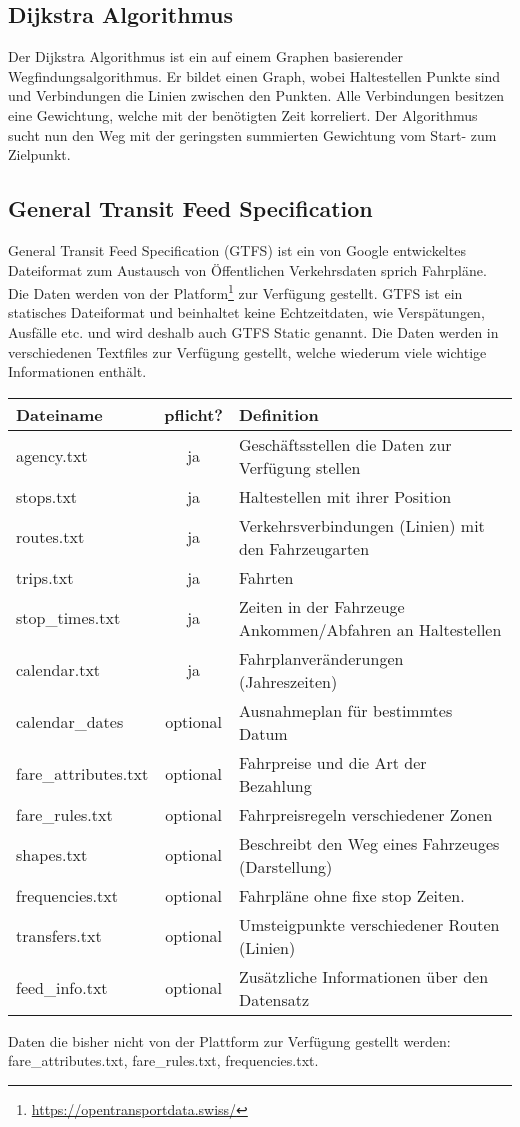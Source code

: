 \subsection{Dijkstra Algorithmus}
Der Dijkstra Algorithmus ist ein auf einem Graphen basierender Wegfindungsalgorithmus. Er bildet einen Graph, wobei Haltestellen Punkte sind und Verbindungen die Linien zwischen den Punkten. Alle Verbindungen besitzen eine Gewichtung, welche mit der benötigten Zeit korreliert. Der Algorithmus sucht nun den Weg mit der geringsten summierten Gewichtung vom Start- zum Zielpunkt.


 

\subsection{General Transit Feed Specification}
General Transit Feed Specification (GTFS) ist ein von Google entwickeltes Dateiformat zum Austausch von Öffentlichen Verkehrsdaten sprich Fahrpläne. Die Daten werden von der Platform\footnote{\url{https://opentransportdata.swiss/}} zur Verfügung gestellt. GTFS ist ein statisches Dateiformat und beinhaltet keine Echtzeitdaten, wie Verspätungen, Ausfälle etc. und wird deshalb auch GTFS Static genannt. Die Daten werden in verschiedenen Textfiles zur Verfügung gestellt, welche wiederum viele wichtige Informationen enthält.\newline

\begin{tabular}{|l|c|l|}  \hline
	Dateiname & pflicht? & Definition \\ \hline
	agency.txt & ja & Geschäftsstellen die Daten zur Verfügung stellen \\ \hline
	stops.txt & ja & Haltestellen mit ihrer Position \\ \hline
	routes.txt & ja & Verkehrsverbindungen (Linien) mit den Fahrzeugarten \\ \hline %
	trips.txt & ja & Fahrten  \\ \hline												%
	stop\_times.txt & ja & Zeiten in der Fahrzeuge Ankommen/Abfahren an Haltestellen \\ \hline
	calendar.txt & ja & Fahrplanveränderungen (Jahreszeiten) \\ \hline
	calendar\_dates & optional & Ausnahmeplan für bestimmtes Datum \\ \hline
	fare\_attributes.txt & optional & Fahrpreise und die Art der Bezahlung \\ \hline
	fare\_rules.txt & optional & Fahrpreisregeln verschiedener Zonen  \\ \hline
	shapes.txt & optional & Beschreibt den Weg eines Fahrzeuges (Darstellung) \\ \hline
	frequencies.txt & optional & Fahrpläne ohne fixe stop Zeiten. \\ \hline
	transfers.txt & optional & Umsteigpunkte verschiedener Routen (Linien) \\ \hline
	feed\_info.txt & optional & Zusätzliche Informationen über den Datensatz \\ \hline	
\end{tabular}

Daten die bisher nicht von der Plattform zur Verfügung gestellt werden: fare\_attributes.txt, fare\_rules.txt, frequencies.txt.


